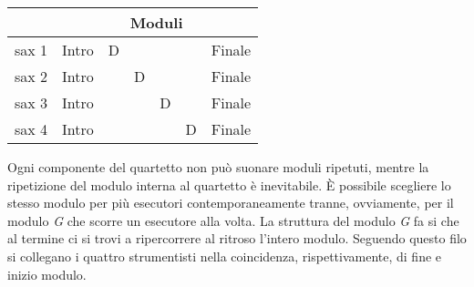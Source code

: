 \documentclass[10pt, a4paper, twoside]{book}
\begin{document}
\begin{multicols}{2}
\bigskip
\setlength{\tabcolsep}{7pt}
\renewcommand{\arraystretch}{1.2}

\begin{center}
\begin{tabular}{r c c c c c c}

& \multicolumn{6}{c}{Moduli} \\
\hline
\hline 
sax 1 & Intro & D & & & & Finale \\
\hline
\hline
sax 2 & Intro & & D & & & Finale \\
\hline
\hline
sax 3 & Intro & & & D & & Finale \\
\hline
\hline
sax 4 & Intro & & & & D & Finale \\
\hline
\hline
\end{tabular}
\end{center}

\bigskip


Ogni componente del quartetto non può suonare moduli ripetuti, mentre la ripetizione del modulo interna al quartetto è inevitabile. È possibile scegliere lo stesso modulo per più esecutori contemporaneamente tranne, ovviamente, per il modulo \emph{G} che scorre un esecutore alla volta. La struttura del modulo \emph{G} fa si che al termine ci si trovi a ripercorrere al ritroso l'intero modulo. Seguendo questo filo si collegano i quattro strumentisti nella coincidenza, rispettivamente, di fine e inizio modulo.




\end{multicols}

\end{document}
